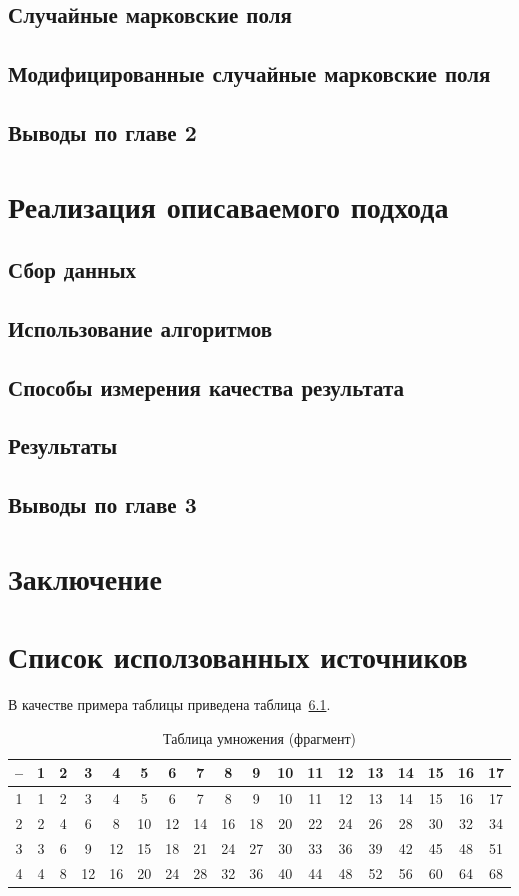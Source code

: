 \documentclass[annotation,times,page4]{itmo-student-thesis}
\begin{document}
\section{Случайные марковские поля}
\section{Модифицированные случайные марковские поля}
\section{Выводы по главе 2}

\chapter{Реализация описаваемого подхода}
\section{Сбор данных}
\section{Использование алгоритмов}
\section{Способы измерения качества результата}
\section{Результаты}
\section{Выводы по главе 3}

\chapter{Заключение}
\chapter{Список исползованных источников}



В качестве примера таблицы приведена таблица~\ref{tab1}.

\begin{table}[!h]
\caption{Таблица умножения (фрагмент)}\label{tab1}
\centering
\begin{tabular}{|*{18}{c|}}\hline
-- & 1 & 2 & 3 & 4 & 5 & 6 & 7 & 8 & 9 & 10 & 11 & 12 & 13 & 14 & 15 & 16 & 17 \\\hline
1  & 1 & 2 & 3 & 4 & 5 & 6 & 7 & 8 & 9 & 10 & 11 & 12 & 13 & 14 & 15 & 16 & 17 \\\hline
2  & 2 & 4 & 6 & 8 & 10 & 12 & 14 & 16 & 18 & 20 & 22 & 24 & 26 & 28 & 30 & 32 & 34 \\\hline
3  & 3 & 6 & 9 & 12 & 15 & 18 & 21 & 24 & 27 & 30 & 33 & 36 & 39 & 42 & 45 & 48 & 51 \\\hline
4  & 4 & 8 & 12 & 16 & 20 & 24 & 28 & 32 & 36 & 40 & 44 & 48 & 52 & 56 & 60 & 64 & 68 \\\hline
\end{tabular}
\end{table}
\end{document}
